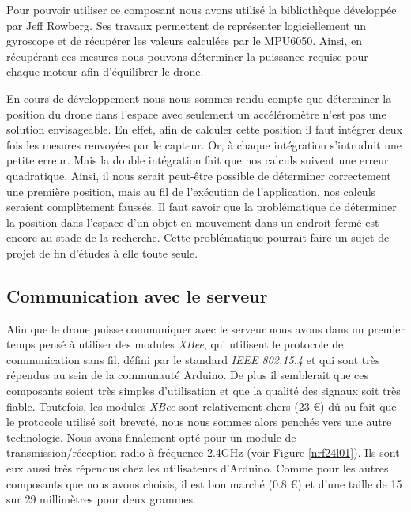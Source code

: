 \documentclass[a4paper,10pt]{report}
\begin{document}
	Pour pouvoir utiliser ce composant nous avons utilisé la bibliothèque 
développée par Jeff Rowberg\cite{jeff_rowberg_lib}. Ses travaux permettent de 
représenter logiciellement un gyroscope et de récupérer les valeurs calculées 
par le MPU6050. Ainsi, en récupérant ces mesures nous pouvons déterminer la 
puissance requise pour chaque moteur afin d'équilibrer le drone.

	En cours de développement nous nous sommes rendu compte que déterminer 
la position du drone dans l'espace avec seulement un accéléromètre n'est pas 
une solution envisageable. En effet, afin de calculer cette position il faut 
intégrer deux fois les mesures renvoyées par le capteur. Or, à chaque 
intégration s'introduit une petite erreur. Mais la double intégration fait que 
nos calculs suivent une erreur quadratique. Ainsi, il nous serait peut-être 
possible de déterminer correctement une première position, mais au fil de 
l'exécution de l'application, nos calculs seraient complètement faussés. Il 
faut savoir que la problématique de déterminer la position dans l'espace d'un 
objet en mouvement dans un endroit fermé est encore au stade de la recherche. 
Cette problématique pourrait faire un sujet de projet de fin d'études à elle 
toute seule.
      
      \subsection{Communication avec le serveur}
	Afin que le drone puisse communiquer avec le serveur nous avons dans un 
premier temps pensé à utiliser des modules \textit{XBee}, qui utilisent le 
protocole de communication sans fil, défini par le standard \textit{IEEE 
802.15.4} et qui sont très répendus au sein de la communauté Arduino. De plus 
il semblerait que ces composants soient très simples d'utilisation et que la 
qualité des signaux soit très fiable. Toutefois, les modules \textit{XBee} 
sont relativement chers (23 \euro) dû au fait que le protocole utilisé soit 
breveté, nous nous sommes alors penchés vers une autre technologie. Nous avons 
finalement opté pour un module de transmission/réception radio à fréquence 
2.4GHz (voir Figure \ref{nrf24l01}). Ils sont eux aussi très répendus chez les 
utilisateurs d'Arduino. Comme pour les autres composants que nous avons 
choisis, il est bon marché (0.8 \euro) et d'une taille de 15 sur 29 millimètres 
pour deux grammes.
	
\end{document}
